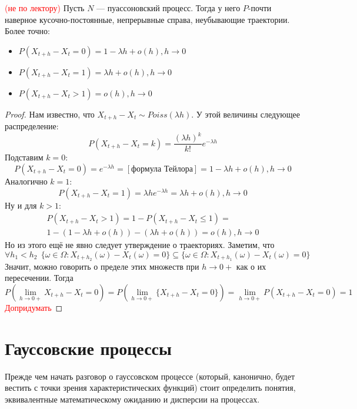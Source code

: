 \begin{proposition} \textcolor{red}{(не по лектору)}
	Пусть $N$ --- пуассоновский процесс. Тогда у него $P$-почти наверное кусочно-постоянные, непрерывные справа, неубывающие траектории. Более точно:
	\begin{itemize}
		\item $P(X_{t + h} - X_t = 0) = 1 - \lambda h + o(h), h \to 0$
		
		\item $P(X_{t + h} - X_t = 1) = \lambda h + o(h), h \to 0$
		
		\item $P(X_{t + h} - X_t > 1) = o(h), h \to 0$
	\end{itemize}
\end{proposition}

\begin{proof}
	Нам известно, что $X_{t + h} - X_t \sim Poiss(\lambda h)$. У этой величины следующее распределение:
	\[
		P(X_{t + h} - X_t = k) = \frac{(\lambda h)^k}{k!}e^{-\lambda h}
	\]
	Подставим $k = 0$:
	\[
		P(X_{t + h} - X_t = 0) = e^{-\lambda h} = [\text{формула Тейлора}] = 1 - \lambda h + o(h), h \to 0
	\]
	Аналогично $k = 1$:
	\[
		P(X_{t + h} - X_t = 1) = \lambda he^{-\lambda h} = \lambda h + o(h), h \to 0
	\]
	Ну и для $k > 1$:
	\begin{multline*}
		P(X_{t + h} - X_t > 1) = 1 - P(X_{t + h} - X_t \le 1) =
		\\
		1 - (1 - \lambda h + o(h)) - (\lambda h + o(h)) = o(h), h \to 0
	\end{multline*}
	Но из этого ещё не явно следует утверждение о траекториях. Заметим, что
	\[
		\forall h_1 < h_2\ \ \{\omega \in \Omega \colon X_{t + h_2}(\omega) - X_t(\omega) = 0\} \subseteq \{\omega \in \Omega \colon X_{t + h_1}(\omega) - X_t(\omega) = 0\}
	\]
	Значит, можно говорить о пределе этих множеств при $h \to 0+$ как о их пересечении. Тогда
	\[
		P(\lim_{h \to 0+} X_{t + h} - X_t = 0) = P(\lim_{h \to 0+} \{X_{t + h} - X_t = 0\}) = \lim_{h \to 0+} P(X_{t + h} - X_t = 0) = 1
	\]
	\textcolor{red}{Допридумать}
\end{proof}

\section{Гауссовские процессы}

\begin{anote}
	Прежде чем начать разговор о гауссовском процессе (который, канонично, будет вестить с точки зрения характеристических функций) стоит определить понятия, эквивалентные математическому ожиданию и дисперсии на процессах.
\end{anote}

